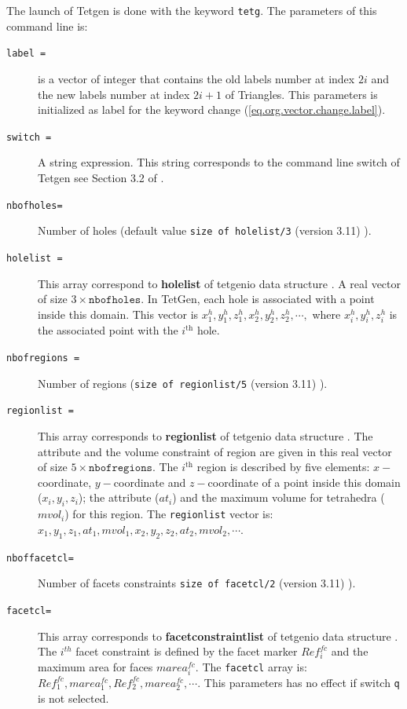 \documentclass[a4paper,twoside,12pt]{book}
\begin{document}
The launch of Tetgen is done with the keyword \texttt{tetg}. The parameters of this command line is:

\begin{description}
\item [\texttt{label =}] is a vector of integer that contains the old labels number at index $2i$  and the new labels number at index $2i+1$ of Triangles.
This parameters is initialized as label for the keyword change (\ref{eq.org.vector.change.label}).
\item [\texttt{switch  =}] A string expression. This string corresponds to the command line switch of Tetgen see Section 3.2 of \cite{tetgen}.
\item [\texttt{nbofholes=}] Number of holes (default value \verb!size of holelist/3! (version 3.11) ).
\item [\texttt{holelist =}] This array correspond to {\bf{holelist}} of tetgenio data structure \cite{tetgen}.
A real vector of size $3\times \texttt{nbofholes}$. In TetGen, each hole is associated with a point inside this domain.
This vector is $x_{1}^{h}, y_{1}^{h}, z_{1}^{h}, x_{2}^{h}, y_{2}^{h}, z_{2}^{h}, \cdots,$ where $x_{i}^{h},y_{i}^{h},z_{i}^{h}$
is the associated point with the $i^{\mathrm{th}}$ hole.
\item [\texttt{nbofregions =}] Number of regions (\verb!size of regionlist/5! (version 3.11) ). 
\item [\texttt{regionlist =}] This array corresponds to {\bf{regionlist}} of tetgenio data structure \cite{tetgen}.
The attribute and the volume constraint of region are given in this real vector of size $5\times \texttt{nbofregions}$.
The $i^{\mathrm{th}}$ region is described by five elements: $x-$coordinate, $y-$coordinate and $z-$coordinate of
a point inside this domain ($x_{i},y_{i},z_{i}$); the attribute ($at_{i}$) and the maximum volume for tetrahedra ($mvol_{i}$) for this region.
The \texttt{regionlist} vector is: $x_{1}, y_{1}, z_{1}, at_{1}, mvol_{1}, x_{2}, y_{2}, z_{2}, at_{2}, mvol_{2}, \cdots  $.
\item [\texttt{nboffacetcl=}] Number of facets constraints \verb!size of facetcl/2! (version 3.11) ).
\item [\texttt{facetcl=}] This array corresponds to {\bf{facetconstraintlist}} of tetgenio data structure \cite{tetgen}.
The $i^{th}$ facet constraint is defined by the facet marker $Ref_{i}^{fc}$ and the maximum area for faces $marea_{i}^{fc}$.
The \texttt{facetcl} array is: $Ref_{1}^{fc}, marea_{1}^{fc}, Ref_{2}^{fc}, marea_{2}^{fc}, \cdots$.
This parameters has no effect if switch \texttt{q} is not selected.
\end{description}
\end{document}
